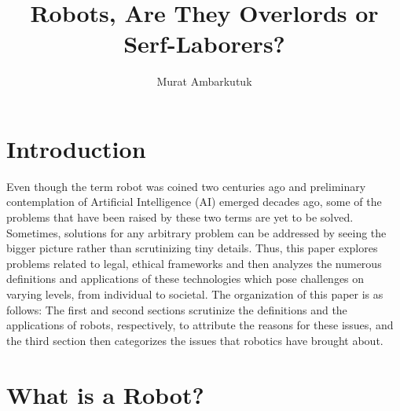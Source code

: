 \documentclass[man]{apa6}
\title{Robots, Are They Overlords or Serf-Laborers?}
\author{Murat Ambarkutuk}
\affiliation{English Language Institute, University of Delaware \\ murata@udel.edu}
\begin{document}
\maketitle

\section{Introduction}
Even though the term robot was coined two centuries ago and preliminary contemplation of Artificial Intelligence (AI) emerged decades ago, some of the problems that have been raised by these two terms are yet to be solved.
Sometimes, solutions for any arbitrary problem can be addressed by seeing the bigger picture rather than scrutinizing tiny details.
Thus, this paper explores problems related to legal, ethical frameworks and then analyzes the numerous definitions and applications of these technologies which pose challenges on varying levels, from individual to societal.
The organization of this paper is as follows: The first and second sections scrutinize the definitions and the applications of robots, respectively, to attribute the reasons for these issues, and the third section then categorizes the issues that robotics have brought about.

\section{What is a Robot?}
\par
\end{document}
